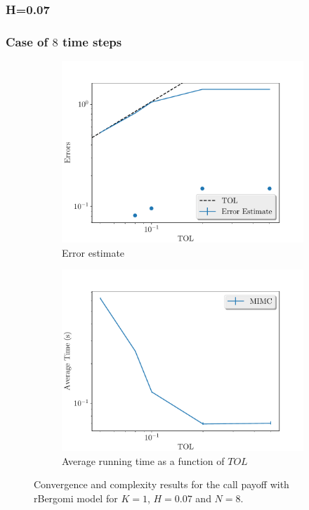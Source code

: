 \documentclass[11pt]{article}
\begin{document}
\newpage
\subsubsection*{H=0.07}
\newpage
\subsubsection*{Case of $8$ time steps}
\begin{figure}[!h]
	\centering
	\begin{subfigure}{.4\textwidth}
		\centering
		\includegraphics[width=1\linewidth]{./figures/bergomi_misc/H_007/N_8/error_estimate.pdf}
		\caption{Error estimate}
		\label{fig:misc_rbergomi_8_steps_sub1}
	\end{subfigure}%
	\begin{subfigure}{.4\textwidth}
		\centering
		\includegraphics[width=1\linewidth]{./figures/bergomi_misc/H_007/N_8/average_running_time.pdf}
		\caption{Average running time as a function of $TOL$}
		\label{fig:misc_rbergomi_8_steps_sub2}
	\end{subfigure}%
	\caption{Convergence and complexity results for the call payoff with rBergomi model for $K=1$, $H=0.07$ and $N=8$.}
	\label{fig:misc_rbergomi_8_steps_1}
\end{figure}
\end{document}
